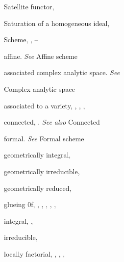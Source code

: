 {{\noindent\hspace*{0.0bp}Satellite functor, \par
\noindent\hspace*{0.0bp}Saturation of a homogeneous ideal, \par
\noindent\hspace*{0.0bp}Scheme, , --\par
\noindent\hspace*{7.5bp}affine. \emph{See} Affine scheme\par
\noindent\hspace*{7.5bp}associated complex analytic space. \emph{See}\par
\noindent\hspace*{15.0bp}Complex analytic space\par
\noindent\hspace*{7.5bp}associated to a variety, , , , \par
\noindent\hspace*{7.5bp}connected, . \emph{See also} Connected\par
\noindent\hspace*{7.5bp}formal. \emph{See} Formal scheme\par
\noindent\hspace*{7.5bp}geometrically integral, \par
}\hfill%
\parbox[t]{162.5bp}{\fontsize{8.05}{8.49}\selectfont%
\raggedright\setlength{\parskip}{0pt}%
\noindent\hspace*{7.5bp}geometrically irreducible, \par
\noindent\hspace*{7.5bp}geometrically reduced, \par
\noindent\hspace*{7.5bp}glueing 0f, , , , , , \par
\noindent\hspace*{7.5bp}integral, , \par
\noindent\hspace*{7.5bp}irreducible, \par
\noindent\hspace*{7.5bp}locally factorial, , , , \par
}}
